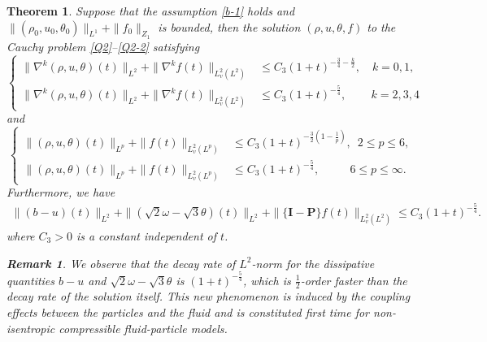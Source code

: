 \documentclass[10pt,a4paper]{amsart}
\newtheorem{thm}{Theorem}
\newtheorem{rem}{Remark}
\begin{document}
\begin{thm}\label{T1.4}
 Suppose that the assumption
\eqref{b-1} holds and $\|(\rho_0,u_0,\theta_0)\|_{L^1}+\|f_0\|_{ {Z}_1}$ is bounded, then
the solution $(\rho,u,\theta,f)$ to the Cauchy problem \eqref{Q2}--\eqref{Q2-2} satisfying
 \begin{equation}\label{d1} 
\left\{
\begin{aligned}
 \|\nabla^k(\rho, u, \theta)(t)\|_{L^2 } +\|\nabla^kf(t)\|_{{L_v^2(L^{2})}}
&\leq C_3(1+t)^{-\frac{3}{4}-\frac{k}{2}},\quad k=0,1, \\
\|\nabla^k(\rho, u, \theta)(t)\|_{L^2 } +\|\nabla^kf(t)\|_{{L_v^2(L^{2})}}
&\leq C_3(1+t)^{-\frac{5}{4}},\quad\,\,\,\,\,\,\, k=2,3,4
\end{aligned}
\right.
\end{equation}
and
 \begin{equation} \label{d2}
\left\{
\begin{aligned}
\| (\rho, u, \theta)(t)\|_{L^p}+\|  f(t)\|_{L_v^2(L^p)}
 &\leq C_3(1+t)^{-\frac{3}{2}(1-\frac{1}{p})},\,\,\, 2\leq p\leq 6, \\  
\| (\rho, u, \theta)(t)\|_{L^p}+\|  f(t)\|_{L_v^2(L^p)}
 &\leq C_3(1+t)^{-\frac{5}{4} },\,\,\,\quad\quad\,  6\leq p\leq \infty. 
\end{aligned}
\right.
\end{equation}
Furthermore, we have 
\begin{align}\label{NJKd3}
 \|  (b-u)(t)\|_{L^2}+\|  (\sqrt{2}\omega-\sqrt{3}\theta)(t)\|_{L^2}
 +\|  \{\mathbf{I}-\mathbf{P}\}f(t)\|_{L_v^2(L^2)}  \leq C_3(1+t)^{-\frac{5}{4} }.
\end{align}
where    $C_3>0$ is a constant independent of    $t$. 

\begin{rem}
 We observe that the decay rate of   $L^2$-norm for the dissipative 
 quantities $ b - u $ and $ \sqrt{2}\omega - \sqrt{3}\theta $ is
  $ (1 + t)^{-\frac{5}{4}} $, which is  $\frac{1}{2}$-order faster 
  than the decay rate of the solution itself. This  new phenomenon is induced by the coupling effects between 
 the particles and the fluid and is constituted   first time for non-isentropic compressible fluid-particle models. 
\end{rem} 
 

\end{thm}
\end{document}
